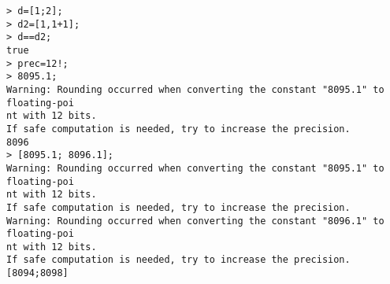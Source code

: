 \begin{center}\begin{minipage}{15cm}\begin{Verbatim}[frame=single]
> d=[1;2];
> d2=[1,1+1];
> d==d2;
true
> prec=12!;
> 8095.1;
Warning: Rounding occurred when converting the constant "8095.1" to floating-poi
nt with 12 bits.
If safe computation is needed, try to increase the precision.
8096
> [8095.1; 8096.1];
Warning: Rounding occurred when converting the constant "8095.1" to floating-poi
nt with 12 bits.
If safe computation is needed, try to increase the precision.
Warning: Rounding occurred when converting the constant "8096.1" to floating-poi
nt with 12 bits.
If safe computation is needed, try to increase the precision.
[8094;8098]
\end{Verbatim}
\end{minipage}\end{center}
